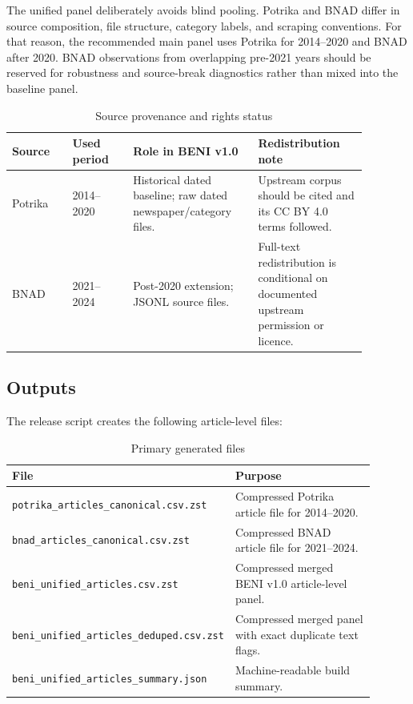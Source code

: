 \documentclass[11pt]{article}
\begin{document}
The unified panel deliberately avoids blind pooling. Potrika and BNAD differ in source composition, file structure, category labels, and scraping conventions. For that reason, the recommended main panel uses Potrika for 2014--2020 and BNAD after 2020. BNAD observations from overlapping pre-2021 years should be reserved for robustness and source-break diagnostics rather than mixed into the baseline panel.

\begin{table}[htbp]
\centering
\caption{Source provenance and rights status}
\label{tab:source-provenance}
\small
\begin{tabular}{L{0.15\linewidth}L{0.15\linewidth}L{0.31\linewidth}L{0.27\linewidth}}
\toprule
Source & Used period & Role in BENI v1.0 & Redistribution note\\
\midrule
Potrika & 2014--2020 & Historical dated baseline; raw dated newspaper/category files. & Upstream corpus should be cited and its CC BY 4.0 terms followed.\\
BNAD & 2021--2024 & Post-2020 extension; JSONL source files. & Full-text redistribution is conditional on documented upstream permission or licence.\\
\bottomrule
\end{tabular}
\end{table}

\subsection{Outputs}

The release script creates the following article-level files:

\begin{table}[htbp]
\centering
\caption{Primary generated files}
\begin{tabular}{L{0.42\linewidth}L{0.48\linewidth}}
\toprule
File & Purpose\\
\midrule
\texttt{potrika\_articles\_canonical.csv.zst} & Compressed Potrika article file for 2014--2020.\\
\texttt{bnad\_articles\_canonical.csv.zst} & Compressed BNAD article file for 2021--2024.\\
\texttt{beni\_unified\_articles.csv.zst} & Compressed merged BENI v1.0 article-level panel.\\
\texttt{beni\_unified\_articles\_deduped.csv.zst} & Compressed merged panel with exact duplicate text flags.\\
\texttt{beni\_unified\_articles\_summary.json} & Machine-readable build summary.\\
\bottomrule
\end{tabular}
\end{table}
\end{document}
